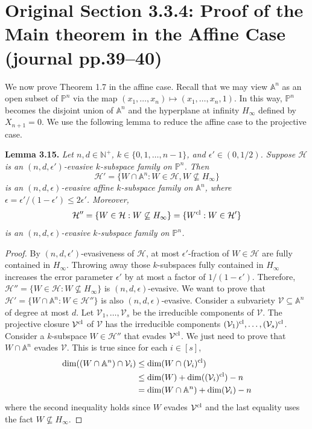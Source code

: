 \documentclass[10pt,a4paper]{article}
\newcommand{\PP}{\mathbb P}
\newcommand{\Aspace}{\mathbb A}
\newenvironment{result}[1]{\par\medskip\noindent\textbf{#1.}\itshape}{\par\medskip}
\begin{document}
\section*{Original Section 3.3.4: Proof of the Main theorem in the Affine Case (journal pp.39--40)}
We now prove Theorem 1.7 in the affine case. Recall that we may view $\Aspace^n$ as an open subset of $\PP^n$ via the map $(x_1,\ldots,x_n)\mapsto(x_1,\ldots,x_n,1)$. In this way, $\PP^n$ becomes the disjoint union of $\Aspace^n$ and the hyperplane at infinity $H_\infty$ defined by $X_{n+1}=0$.
We use the following lemma to reduce the affine case to the projective case.
\begin{result}{Lemma 3.15}
Let $n,d\in\mathbb N^+$, $k\in\{0,1,\ldots,n-1\}$, and $\epsilon'\in(0,1/2)$. Suppose $\mathcal H$ is an $(n,d,\epsilon')$-evasive $k$-subspace family on $\PP^n$. Then
\[\mathcal H'=\{W\cap\Aspace^n:W\in\mathcal H,W\not\subseteq H_\infty\}\]
is an $(n,d,\epsilon)$-evasive affine $k$-subspace family on $\Aspace^n$, where $\epsilon=\epsilon'/(1-\epsilon')\le2\epsilon'$. Moreover,
\[\mathcal H''=\{W\in\mathcal H:W\not\subseteq H_\infty\}=\{W^{\rm cl}:W\in\mathcal H'\}\]
is an $(n,d,\epsilon)$-evasive $k$-subspace family on $\PP^n$.
\end{result}
\begin{proof}
By $(n,d,\epsilon')$-evasiveness of $\mathcal H$, at most $\epsilon'$-fraction of $W\in\mathcal H$ are fully contained in $H_\infty$. Throwing away those $k$-subspaces fully contained in $H_\infty$ increases the error parameter $\epsilon'$ by at most a factor of $1/(1-\epsilon')$. Therefore, $\mathcal H''=\{W\in\mathcal H:W\not\subseteq H_\infty\}$ is $(n,d,\epsilon)$-evasive. We want to prove that $\mathcal H'=\{W\cap\Aspace^n:W\in\mathcal H''\}$ is also $(n,d,\epsilon)$-evasive.
Consider a subvariety $\mathcal V\subseteq\Aspace^n$ of degree at most $d$. Let $\mathcal V_1,\ldots,\mathcal V_s$ be the irreducible components of $\mathcal V$. The projective closure $\mathcal V^{\rm cl}$ of $\mathcal V$ has the irreducible components $(\mathcal V_1)^{\rm cl},\ldots,(\mathcal V_s)^{\rm cl}$. Consider a $k$-subspace $W\in\mathcal H''$ that evades $\mathcal V^{\rm cl}$. We just need to prove that $W\cap\Aspace^n$ evades $\mathcal V$. This is true since for each $i\in[s]$,
\begin{align*}
\dim((W\cap\Aspace^n)\cap\mathcal V_i)&\le\dim(W\cap(\mathcal V_i)^{\rm cl})\\
&\le\dim(W)+\dim((\mathcal V_i)^{\rm cl})-n\\
&=\dim(W\cap\Aspace^n)+\dim(\mathcal V_i)-n
\end{align*}
where the second inequality holds since $W$ evades $\mathcal V^{\rm cl}$ and the last equality uses the fact $W\not\subseteq H_\infty$.
\end{proof}
\end{document}
